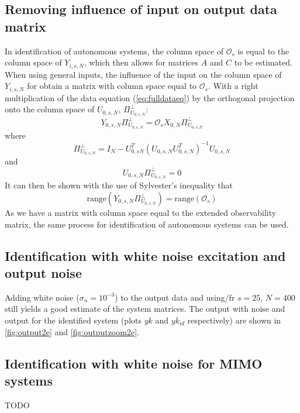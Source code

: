 \documentclass[11pt,a4paper]{article}
\begin{document}
\subsection{Removing influence of input on output data matrix}
In identification of autonomous systems, the column space of $\mathcal{O}_s$ is
equal to the column space of $Y_{i, s, N}$, which then allows for matrices $A$
and $C$ to be estimated. When using general inputs, the influence of the input
on the column space of $Y_{i, s, N}$ for obtain a matrix with column space
equal to $\mathcal{O}_s$. With a right multiplication of the data equation
(\autoref{eq:fulldataeq}) by the orthogonal projection onto the column space of
$U_{0, s, N}$, $\Pi^\perp_{U_{0,s,N}}$:
\begin{equation}
    \label{eq:yuperp}
    Y_{0, s, N} \Pi^\perp_{U_{0,s,N}} =
        \mathcal{O}_s X_{0, N} \Pi^\perp_{U_{0,s,N}} 
\end{equation}
where 
\begin{equation}
    \label{eq:uoperp}
    \Pi^\perp_{U_{0,s,N}} =
        I_N - U^T_{0,s N}(U_{0, s, N}U^T_{0,s,N})^{-1} U_{0,s,N}
\end{equation}
and
\begin{equation*}
    U_{0,s,N} \Pi^\perp_{U_{0,s,N}} = 0
\end{equation*}
It can then be shown with the use of Sylvester's inequality that
\begin{equation*}
    \text{range}(Y_{0,s,N} \Pi^\perp_{U_{0,s,N}}) =
        \text{range}(\mathcal{O}_s)
\end{equation*}
As we have a matrix with column space equal to the extended observability
matrix, the same process for identification of autonomous systems can be used.

\subsection{Identification with white noise excitation and output noise}
Adding white noise ($\sigma_n = 10^{-3}$) to the output data and using/fr
\mbox{$s = 25$}, \mbox{$N = 400$} still yields a good estimate of the system
matrices. The output with noise and output for the identified system (plots
$yk$ and $yk_{id}$ respectively) are shown in \autoref{fig:output2e} and
\autoref{fig:outputzoom2e}.

\subsection{Identification with white noise for MIMO systems}
TODO
\end{document}

